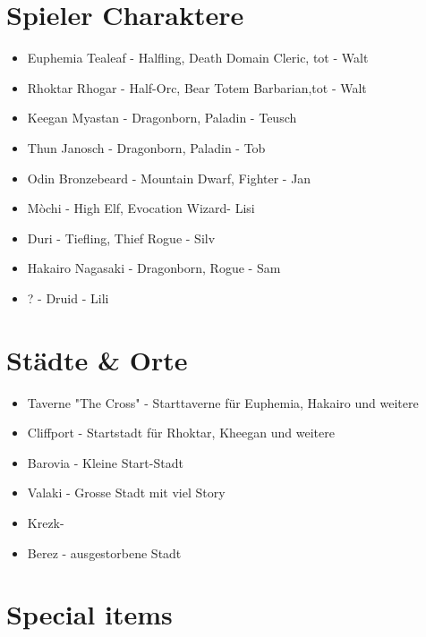\documentclass{article}
\begin{document}
\section{Spieler Charaktere}
\begin{itemize}
	\item Euphemia Tealeaf - Halfling, Death Domain Cleric, tot - Walt
	\item Rhoktar Rhogar - Half-Orc, Bear Totem Barbarian,tot - Walt
	\item Keegan Myastan - Dragonborn, Paladin - Teusch
	\item Thun Janosch - Dragonborn, Paladin - Tob
	\item Odin Bronzebeard - Mountain Dwarf, Fighter - Jan
	\item Mòchi - High Elf, Evocation Wizard- Lisi
	\item Duri - Tiefling, Thief Rogue - Silv
	\item Hakairo Nagasaki - Dragonborn, Rogue - Sam
	\item ? - Druid - Lili
\end{itemize}
\section{Städte \& Orte}
\begin{itemize}
	\item Taverne "The Cross" - Starttaverne für Euphemia, Hakairo und weitere
	\item Cliffport - Startstadt für Rhoktar, Kheegan und weitere
	\item Barovia - Kleine Start-Stadt
	\item Valaki - Grosse Stadt mit viel Story
	\item Krezk-
	\item Berez - ausgestorbene Stadt
\end{itemize}
\section{Special items}
\end{document}
